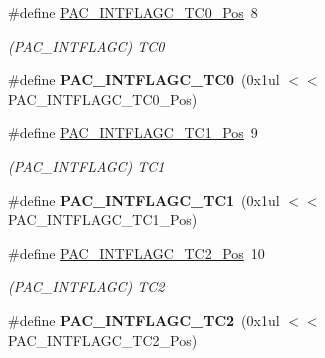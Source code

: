 \begin{DoxyCompactItemize}
\item 
\hypertarget{group___s_a_m_l21___p_a_c_ga110f573e5a61619b65a7634ce75ece2e}{}\#define \hyperlink{group___s_a_m_l21___p_a_c_ga110f573e5a61619b65a7634ce75ece2e}{P\+A\+C\+\_\+\+I\+N\+T\+F\+L\+A\+G\+C\+\_\+\+T\+C0\+\_\+\+Pos}~8\label{group___s_a_m_l21___p_a_c_ga110f573e5a61619b65a7634ce75ece2e}

\begin{DoxyCompactList}\small\item\em (P\+A\+C\+\_\+\+I\+N\+T\+F\+L\+A\+G\+C) T\+C0 \end{DoxyCompactList}\item 
\hypertarget{group___s_a_m_l21___p_a_c_gab6f39754ee735dc9984f5e3a4f3b3abc}{}\#define {\bfseries P\+A\+C\+\_\+\+I\+N\+T\+F\+L\+A\+G\+C\+\_\+\+T\+C0}~(0x1ul $<$$<$ P\+A\+C\+\_\+\+I\+N\+T\+F\+L\+A\+G\+C\+\_\+\+T\+C0\+\_\+\+Pos)\label{group___s_a_m_l21___p_a_c_gab6f39754ee735dc9984f5e3a4f3b3abc}

\item 
\hypertarget{group___s_a_m_l21___p_a_c_ga219c5294238d0e877e80bb25cabfe7ef}{}\#define \hyperlink{group___s_a_m_l21___p_a_c_ga219c5294238d0e877e80bb25cabfe7ef}{P\+A\+C\+\_\+\+I\+N\+T\+F\+L\+A\+G\+C\+\_\+\+T\+C1\+\_\+\+Pos}~9\label{group___s_a_m_l21___p_a_c_ga219c5294238d0e877e80bb25cabfe7ef}

\begin{DoxyCompactList}\small\item\em (P\+A\+C\+\_\+\+I\+N\+T\+F\+L\+A\+G\+C) T\+C1 \end{DoxyCompactList}\item 
\hypertarget{group___s_a_m_l21___p_a_c_gac7c17d1252aebc57161aded507f0acab}{}\#define {\bfseries P\+A\+C\+\_\+\+I\+N\+T\+F\+L\+A\+G\+C\+\_\+\+T\+C1}~(0x1ul $<$$<$ P\+A\+C\+\_\+\+I\+N\+T\+F\+L\+A\+G\+C\+\_\+\+T\+C1\+\_\+\+Pos)\label{group___s_a_m_l21___p_a_c_gac7c17d1252aebc57161aded507f0acab}

\item 
\hypertarget{group___s_a_m_l21___p_a_c_ga552930c4f4f2729d1619e1419e99479e}{}\#define \hyperlink{group___s_a_m_l21___p_a_c_ga552930c4f4f2729d1619e1419e99479e}{P\+A\+C\+\_\+\+I\+N\+T\+F\+L\+A\+G\+C\+\_\+\+T\+C2\+\_\+\+Pos}~10\label{group___s_a_m_l21___p_a_c_ga552930c4f4f2729d1619e1419e99479e}

\begin{DoxyCompactList}\small\item\em (P\+A\+C\+\_\+\+I\+N\+T\+F\+L\+A\+G\+C) T\+C2 \end{DoxyCompactList}\item 
\hypertarget{group___s_a_m_l21___p_a_c_ga6c6f02e19d6914a004a100f07b9ee73c}{}\#define {\bfseries P\+A\+C\+\_\+\+I\+N\+T\+F\+L\+A\+G\+C\+\_\+\+T\+C2}~(0x1ul $<$$<$ P\+A\+C\+\_\+\+I\+N\+T\+F\+L\+A\+G\+C\+\_\+\+T\+C2\+\_\+\+Pos)\label{group___s_a_m_l21___p_a_c_ga6c6f02e19d6914a004a100f07b9ee73c}


\end{DoxyCompactItemize}
